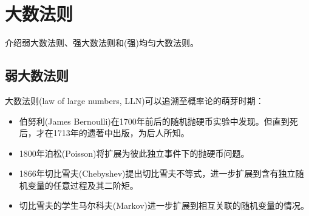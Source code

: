 \section{大数法则}
\label{sec:lln}
介绍弱大数法则、强大数法则和(强)均匀大数法则。

\subsection{弱大数法则}
\label{sec:lln-wlln}
大数法则(law of large numbers, LLN)可以追溯至概率论的萌芽时期：
\begin{itemize}
  \item 伯努利(James Bernoulli)在1700年前后的随机抛硬币实验中发现。但直到死后，才在1713年的遗著中出版，为后人所知。
  \item 1800年泊松(Poisson)将扩展为彼此独立事件下的抛硬币问题。
  \item 1866年切比雪夫(Chebyshev)提出切比雪夫不等式，进一步扩展到含有独立随机变量的任意过程及其二阶矩。
  \item 切比雪夫的学生马尔科夫(Markov)进一步扩展到相互关联的随机变量的情况。
\end{itemize}

